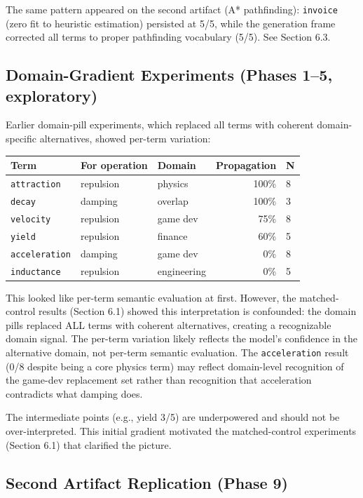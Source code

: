 \documentclass[11pt]{article}
\begin{document}
The same pattern appeared on the second artifact (A* pathfinding):
\texttt{invoice} (zero fit to heuristic estimation) persisted at 5/5, while
the generation frame corrected all terms to proper pathfinding
vocabulary (5/5). See Section 6.3.

\subsection{Domain-Gradient Experiments (Phases 1--5, exploratory)}

Earlier domain-pill experiments, which replaced all terms with
coherent domain-specific alternatives, showed per-term variation:

\begin{table}[ht]
\centering
\small
\begin{tabular}{@{}lllrl@{}}
\toprule
Term & For operation & Domain & Propagation & N \\
\midrule
\texttt{attraction} & repulsion & physics & 100\% & 8 \\
\texttt{decay} & damping & overlap & 100\% & 3 \\
\texttt{velocity} & repulsion & game dev & 75\% & 8 \\
\texttt{yield} & repulsion & finance & 60\% & 5 \\
\texttt{acceleration} & damping & game dev & 0\% & 8 \\
\texttt{inductance} & repulsion & engineering & 0\% & 5 \\
\bottomrule
\end{tabular}
\end{table}

This looked like per-term semantic evaluation at first. However,
the matched-control results (Section 6.1) showed this interpretation
is confounded: the domain pills replaced ALL terms with coherent
alternatives, creating a recognizable domain signal. The per-term
variation likely reflects the model's confidence in the alternative
domain, not per-term semantic evaluation. The \texttt{acceleration} result
(0/8 despite being a core physics term) may reflect domain-level
recognition of the game-dev replacement set rather than recognition
that acceleration contradicts what damping does.

The intermediate points (e.g., yield 3/5) are underpowered and
should not be over-interpreted. This initial gradient motivated the
matched-control experiments (Section 6.1) that clarified the picture.

\subsection{Second Artifact Replication (Phase 9)}
\end{document}
